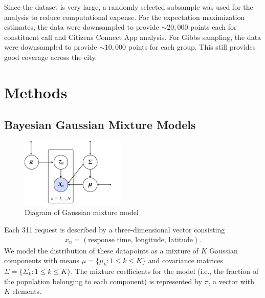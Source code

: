 \documentclass[twoside]{article}
\theoremstyle{theorem}
\theoremstyle{theorem}
\theoremstyle{theorem}
\theoremstyle{lemma}
\theoremstyle{definition}
\theoremstyle{example}
\begin{document}
Since the dataset is very large, a randomly selected subsample was used for the analysis to reduce computational expense. For the expectation maximization estimates, the data were downsampled to provide $\sim20,000$ points each for constituent call and Citizens Connect App analysis. For Gibbs sampling, the data were downsampled to provide $\sim10,000$ points for each group. This still provides good coverage across the city. 
\section{Methods}
\subsection{Bayesian Gaussian Mixture Models}
\begin{figure}
\begin{center}
\includegraphics[width=50mm]{graph_model}
\caption{Diagram of Gaussian mixture model}
\end{center}
\end{figure}
Each 311 request is described by a three-dimensional vector consisting 
\begin{align}
x_n = (\text{response time, longitude, latitude}). 
\end{align}
We model the distribution of these datapoints as a mixture of $K$ Gaussian components with means $\mu = \{\mu_k :  1\leq k\leq K\}$ and covariance matrices $\Sigma = \{\Sigma_k :  1\leq k\leq K\}$. The mixture coefficients for the model (i.e., the fraction of the population belonging to each component) is represented by $\pi$, a vector with $K$ elements.  
\end{document}
